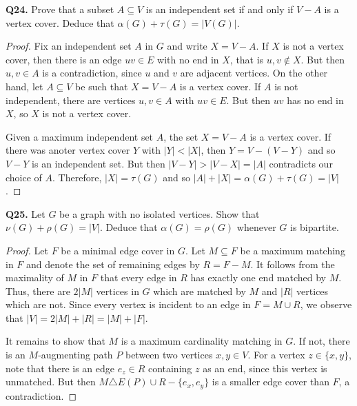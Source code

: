 \noindent \textbf{Q24.} Prove that a subset \( A \subseteq V \) is an independent set if and only if \( V - A \) is a vertex cover. Deduce that \( \alpha (G) + \tau (G) = |V(G)| \). 
\begin{proof}
Fix an independent set \( A \) in \( G \) and write \( X = V - A \). If \( X \) is not a vertex cover, then there is an edge \( uv \in E \) with no end in \( X \), that is \( u, v \notin X \). But then \( u, v \in A \) is a contradiction, since \( u \) and \( v \) are adjacent vertices. On the other hand, let \( A \subseteq V \) be such that \( X = V - A \) is a vertex cover. If \( A \) is not independent, there are vertices \( u,v \in A \) with \( uv \in E \). But then \( uv \) has no end in \( X \), so \( X \) is not a vertex cover.

Given a maximum independent set \( A \), the set \( X = V - A \) is a vertex cover. If there was anoter vertex cover \( Y \) with \( |Y| < |X| \), then \( Y = V - (V - Y) \) and so \( V - Y \) is an independent set. But then \( |V - Y| > |V - X| = |A| \) contradicts our choice of \( A \). Therefore, \( |X| = \tau (G) \) and so \( |A| + |X| = \alpha (G) + \tau (G) = |V| \). 
\end{proof}
\noindent \textbf{Q25.} Let \( G \) be a graph with no isolated vertices. Show that \( \nu (G) + \rho (G) = |V| \). Deduce that \( \alpha (G) = \rho (G) \) whenever \( G \) is bipartite.
\begin{proof}
Let \( F \) be a minimal edge cover in \( G \). Let \( M \subseteq F \) be a maximum matching in \( F \) and denote the set of remaining edges by \( R = F - M \). It follows from the maximality of \( M \) in \( F \) that every edge in \( R \) has exactly one end matched by \( M \). Thus, there are \( 2|M| \) vertices in \( G \) which are matched by \( M \) and \( |R| \) vertices which are not. Since every vertex is incident to an edge in \( F = M \cup R \), we observe that \( |V| = 2|M| + |R| = |M| + |F| \).

It remains to show that \( M \) is a maximum cardinality matching in \( G \). If not, there is an \( M \)-augmenting path \( P \) between two vertices \( x,y \in V \). For a vertex \( z \in \{ x,y \}  \), note that there is an edge \( e_{z} \in R \) containing \( z \) as an end, since this vertex is unmatched. But then \( M \triangle E(P) \cup R - \{ e_{x} , e_{y}  \}  \) is a smaller edge cover than \( F \), a contradiction.
\end{proof}
